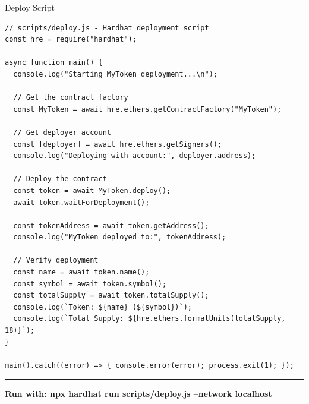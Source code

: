 \documentclass[8pt,aspectratio=169]{beamer}
\newcommand{\bottomnote}[1]{%
\vfill
\vspace{-2mm}
\textcolor{mllavender2}{\rule{\textwidth}{0.4pt}}
\vspace{1mm}
\footnotesize
\textbf{#1}
}
\begin{document}
\begin{frame}[t,fragile]{Deploy Script}
\begin{lstlisting}[style=javascript]
// scripts/deploy.js - Hardhat deployment script
const hre = require("hardhat");

async function main() {
  console.log("Starting MyToken deployment...\n");

  // Get the contract factory
  const MyToken = await hre.ethers.getContractFactory("MyToken");

  // Get deployer account
  const [deployer] = await hre.ethers.getSigners();
  console.log("Deploying with account:", deployer.address);

  // Deploy the contract
  const token = await MyToken.deploy();
  await token.waitForDeployment();

  const tokenAddress = await token.getAddress();
  console.log("MyToken deployed to:", tokenAddress);

  // Verify deployment
  const name = await token.name();
  const symbol = await token.symbol();
  const totalSupply = await token.totalSupply();
  console.log(`Token: ${name} (${symbol})`);
  console.log(`Total Supply: ${hre.ethers.formatUnits(totalSupply, 18)}`);
}

main().catch((error) => { console.error(error); process.exit(1); });
\end{lstlisting}

\bottomnote{Run with: npx hardhat run scripts/deploy.js --network localhost}
\end{frame}
\end{document}
